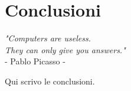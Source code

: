 \clearpage{\pagestyle{empty}\cleardoublepage}

\chapter*{Conclusioni}

\begin{flushright}
\begin{small}\textit{"Computers are useless.\\
 They can only give you answers."}\\
- Pablo Picasso -\\
\end{small}\end{flushright}



Qui scrivo le conclusioni.
